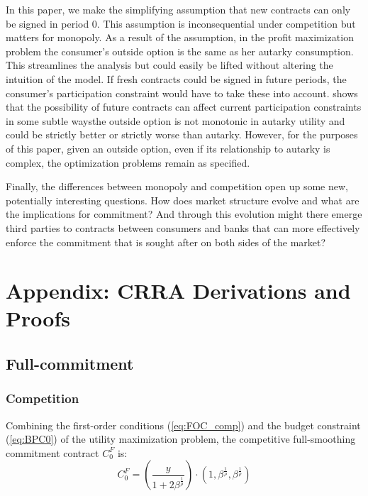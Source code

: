 \documentclass[11pt,english]{article}
\theoremstyle{plain}
\theoremstyle{definition}
\begin{document}
In this paper, we make the simplifying assumption that new contracts
can only be signed in period 0. This assumption is inconsequential
under competition but matters for monopoly. As a result of the assumption,
in the profit maximization problem the consumer\textquoteright s outside
option is the same as her autarky consumption. This streamlines the
analysis but could easily be lifted without altering the intuition
of the model. If fresh contracts could be signed in future periods,
the consumer\textquoteright s participation constraint would have
to take these into account. \citet{basu2020} shows that the possibility
of future contracts can affect current participation constraints in
some subtle ways\textemdash the outside option is not monotonic in
autarky utility and could be strictly better or strictly worse than
autarky. However, for the purposes of this paper, given an outside
option, even if its relationship to autarky is complex, the optimization
problems remain as specified.

Finally, the differences between monopoly and competition open up
some new, potentially interesting questions. How does market structure
evolve and what are the implications for commitment? And through this
evolution might there emerge third parties to contracts between consumers
and banks that can more effectively enforce the commitment that is
sought after on both sides of the market?

\appendix

\section{Appendix: CRRA Derivations and Proofs}

\subsection{Full-commitment}

\subsubsection{Competition}

Combining the first-order conditions (\ref{eq:FOC_comp}) and the
budget constraint (\ref{eq:BPC0}) of the utility maximization problem,
the competitive full-smoothing commitment contract $C_{0}^{F}$ is:
\begin{equation}
C_{0}^{F}=\left(\frac{y}{1+2\beta^{\frac{1}{\rho}}}\right)\cdot\left(1,\beta^{\frac{1}{\rho}},\beta^{\frac{1}{\rho}}\right)\label{eq:c-f}
\end{equation}
\end{document}
